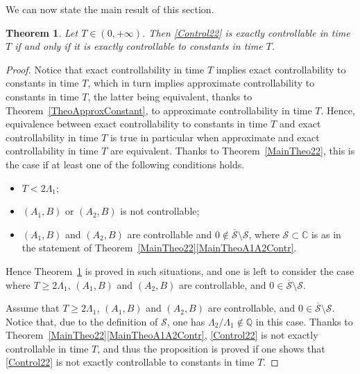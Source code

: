 \documentclass[JEP,XML,SOM,Unicode]{cedram}
\theoremstyle{plain}
\newtheorem{theo}{Theorem}[section]
\theoremstyle{definition}
\begin{document}
We can now state the main result of this section.

\begin{theo}
\label{TheoExactConstant}
Let $T \in (0, +\infty)$. Then \eqref{Control22} is exactly controllable in time $T$ if and only if it is exactly controllable to constants in time $T$.
\end{theo}

\begin{proof}
Notice that exact controllability in time $T$ implies exact controllability to constants in time $T$, which in turn implies approximate controllability to constants in time $T$, the latter being equivalent, thanks to Theorem~\ref{TheoApproxConstant}, to approximate controllability in time $T$. Hence, equivalence between exact controllability to constants in time $T$ and exact controllability in time $T$ is true in particular when approximate and exact controllability in time $T$ are equivalent. Thanks to Theorem~\ref{MainTheo22}, this is the case if at least one of the following conditions holds.
\begin{itemize}
\item $T < 2 \Lambda_1$;
\item $(A_1, B)$ or $(A_2, B)$ is not controllable;
\item $(A_1, B)$ and $(A_2, B)$ are controllable and $0 \notin \overline{\mathcal S} \setminus \mathcal S$, where $\mathcal S \subset \mathbb C$ is as in the statement of Theorem~\ref{MainTheo22}\eqref{MainTheoA1A2Contr}.
\end{itemize}
Hence Theorem~\ref{TheoExactConstant} is proved in such situations, and one is left to consider the case where $T \geq 2 \Lambda_1$, $(A_1, B)$ and $(A_2, B)$ are controllable, and $0 \in \overline{\mathcal S} \setminus \mathcal S$.

Assume that $T \geq 2 \Lambda_1$, $(A_1, B)$ and $(A_2, B)$ are controllable, and $0 \in \overline{\mathcal S} \setminus \mathcal S$. Notice that, due to the definition of $\mathcal S$, one has $\Lambda_2 / \Lambda_1 \notin \mathbb Q$ in this case. Thanks to Theorem~\ref{MainTheo22}\eqref{MainTheoA1A2Contr}, \eqref{Control22} is not exactly controllable in time $T$, and thus the proposition is proved if one shows that \eqref{Control22} is not exactly controllable to constants in time $T$.


\end{proof}
\end{document}
